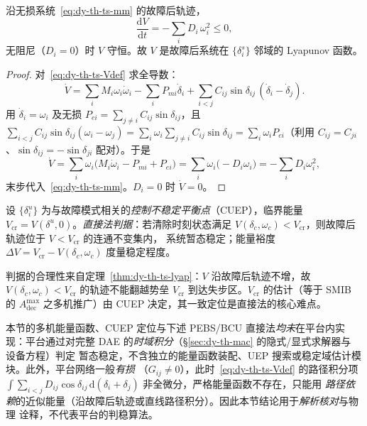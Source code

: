 \begin{theorem}\label{thm:dy-th-ts-lyap}
沿无损系统~\eqref{eq:dy-th-ts-mm} 的故障后轨迹，
\begin{equation}
 \frac{\mathrm dV}{\mathrm dt}=-\sum_i D_i\,\omega_i^2\le0,
 \label{eq:dy-th-ts-dVdt}
\end{equation}
无阻尼（$D_i=0$）时 $V$ 守恒。故 $V$ 是故障后系统在 $\{\delta_i^{s}\}$ 邻域的 Lyapunov 函数。
\end{theorem}

\begin{proof}
对~\eqref{eq:dy-th-ts-Vdef} 求全导数：
\begin{equation*}
 \dot V=\sum_i M_i\omega_i\dot\omega_i-\sum_i P_{mi}\dot\delta_i
 +\sum_{i<j}C_{ij}\sin\delta_{ij}\,(\dot\delta_i-\dot\delta_j).
\end{equation*}
用 $\dot\delta_i=\omega_i$ 及无损 $P_{ei}=\sum_{j\ne i}C_{ij}\sin\delta_{ij}$，且
$\sum_{i<j}C_{ij}\sin\delta_{ij}(\omega_i-\omega_j)=\sum_i\omega_i\sum_{j\ne i}C_{ij}\sin\delta_{ij}
=\sum_i\omega_iP_{ei}$（利用 $C_{ij}=C_{ji}$、$\sin\delta_{ij}=-\sin\delta_{ji}$ 配对）。于是
\begin{equation*}
 \dot V=\sum_i\omega_i\bigl(M_i\dot\omega_i-P_{mi}+P_{ei}\bigr)
 =\sum_i\omega_i\bigl(-D_i\omega_i\bigr)=-\sum_iD_i\omega_i^2,
\end{equation*}
末步代入~\eqref{eq:dy-th-ts-mm}。$D_i=0$ 时 $\dot V=0$。
\end{proof}

\begin{definition}[临界能量与直接判据]\label{def:dy-th-ts-cuep}
设 $\{\delta_i^{u}\}$ 为与故障模式相关的\emph{控制不稳定平衡点}（CUEP），临界能量
$V_{\mathrm{cr}}=V(\delta^{u},0)$。\emph{直接法判据}：若清除时刻状态满足
$V(\delta_{c},\omega_{c})<V_{\mathrm{cr}}$，则故障后轨迹位于 $V<V_{\mathrm{cr}}$ 的连通不变集内，
系统暂态稳定；能量裕度 $\Delta V=V_{\mathrm{cr}}-V(\delta_c,\omega_c)$ 度量稳定程度。
\end{definition}

判据的合理性来自定理~\ref{thm:dy-th-ts-lyap}：$V$ 沿故障后轨迹不增，故 $V(\delta_c,\omega_c)<V_{\mathrm{cr}}$
的轨迹不能翻越势垒 $V_{\mathrm{cr}}$ 到达失步区。$V_{\mathrm{cr}}$ 的估计（等于 SMIB 的
$A_{\mathrm{dec}}^{\max}$ 之多机推广）由 CUEP 决定，其一致定位是直接法的核心难点。

\begin{gapnote}
本节的多机能量函数、CUEP 定位与下述 PEBS/BCU 直接法\emph{均未}在平台内实现：平台通过对完整 DAE
的\emph{时域积分}（\S\ref{sec:dy-th-mac} 的隐式/显式求解器与  设备方程）判定
暂态稳定，不含独立的能量函数装配、UEP 搜索或稳定域估计模块。此外，平台网络一般\emph{有损}
（$G_{ij}\ne0$），此时~\eqref{eq:dy-th-ts-Vdef} 的路径积分项
$\int\sum_{i<j}D_{ij}\cos\delta_{ij}\,\mathrm d(\delta_i+\delta_j)$ 非全微分，严格能量函数不存在，只能用
\emph{路径依赖}的近似能量（沿故障后轨迹或直线路径积分）。因此本节结论用于\emph{解析核对}与物理
诠释，不代表平台的判稳算法。
\end{gapnote}

